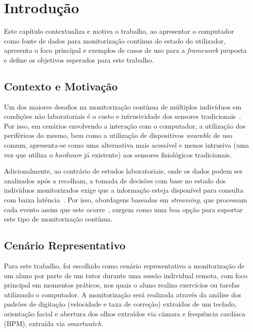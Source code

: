     \chapter{Introdução}
    \label{chap:introduction}

    \begin{introduction}
    Este capítulo contextualiza e motiva o trabalho, ao apresentar o computador como fonte de dados para monitorização contínua do estado do utilizador, apresenta o foco principal e exemplos de casos de uso para a \textit{framework} proposta e define os objetivos esperados para este trabalho.
    \end{introduction}

    \section{Contexto e Motivação}

    Um dos maiores desafios na monitorização contínua de múltiplos indivíduos em condições não laboratoriais é o custo e intrusividade dos sensores tradicionais~\cite{Kallio2025}.
    Por isso, em cenários envolvendo a interação com o computador, a utilização dos periféricos do mesmo, bem como a utilização de dispositivos \textit{wearable} de uso comum, apresenta-se como uma alternativa mais acessível e menos intrusiva (uma vez que utiliza o \textit{hardware} já existente) aos sensores fisiológicos tradicionais.

    Adicionalmente, ao contrário de estudos laboratoriais, onde os dados podem ser analizados após a recolham, a tomada de decisões com base no estado dos indivíduos monitorizados exige que a informação esteja disponível para consulta com baixa latência~\cite{ibm_stream_processing}.
    Por isso, abordagens baseadas em \textit{streaming}, que processam cada evento assim que este ocorre~\cite{Akidau2018}, surgem como uma boa opção para suportar este tipo de monitorização contínua.

    \section{Cenário Representativo}\label{sec:scenario_introduction}

    Para este trabalho, foi escolhido como cenário representativo a monitorização de um aluno por parte de um tutor durante uma sessão individual remota, com foco principal em momentos práticos, nos quais o aluno realiza exercícios ou tarefas utilizando o computador.
    A monitorização será realizada através da análise dos padrões de digitação (velocidade e taxa de correção) extraídos de um teclado, orientação facial e abertura dos olhos extraídos via câmara e frequência cardíaca (\ac{BPM}), extraída via \textit{smartwatch}.

